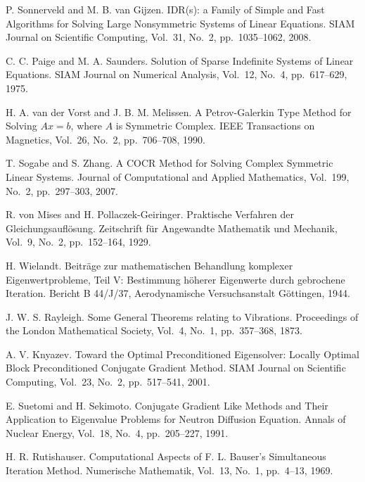 \documentclass[a4paper]{article}
\begin{document}
\begin{thebibliography}{10}
P. Sonnerveld and M. B. van Gijzen.
\newblock IDR(s): a Family of Simple and Fast Algorithms for Solving Large Nonsymmetric Systems of Linear Equations.
\newblock SIAM Journal on Scientific Computing, Vol.~31, No.~2, pp.\ 1035--1062, 2008.

C. C. Paige and M. A. Saunders.
\newblock Solution of Sparse Indefinite Systems of Linear Equations.
\newblock SIAM Journal on Numerical Analysis, Vol.~12, No.~4, pp.\ 617--629, 1975.

H. A. van der Vorst and J. B. M. Melissen.
\newblock A Petrov-Galerkin Type Method for Solving $Ax=b$, where $A$ is Symmetric Complex.
\newblock IEEE Transactions on Magnetics, Vol.~26, No.~2, pp.\ 706--708, 1990.

T. Sogabe and S. Zhang.
\newblock A COCR Method for Solving Complex Symmetric Linear Systems.
\newblock Journal of Computational and Applied Mathematics, Vol.~199, No.~2, pp.\ 297--303, 2007.

R. von Mises and H. Pollaczek-Geiringer.
\newblock Praktische Verfahren der Gleichungsaufl\"osung.
\newblock Zeitschrift f\"ur Angewandte Mathematik und Mechanik, Vol.~9,
	No.~2, pp.\ 152--164, 1929.

H. Wielandt.
\newblock Beitr\"age zur mathematischen Behandlung komplexer
	Eigenwertprobleme, Teil V: Bestimmung h\"oherer Eigenwerte durch
	gebrochene Iteration.
\newblock Bericht B 44/J/37, Aerodynamische Versuchsanstalt G\"ottingen, 1944.

J. W. S. Rayleigh.
\newblock Some General Theorems relating to Vibrations.
\newblock Proceedings of the London Mathematical Society, Vol.~4, No.~1,
	pp.\ 357--368, 1873.

A. V. Knyazev.
\newblock Toward the Optimal Preconditioned Eigensolver: Locally Optimal
	Block Preconditioned Conjugate Gradient Method.
\newblock SIAM Journal on Scientific Computing, Vol.~23, No.~2, pp.\ 517--541, 2001.

E. Suetomi and H. Sekimoto.
\newblock Conjugate Gradient Like Methods and Their Application to
	Eigenvalue Problems for Neutron Diffusion Equation.
\newblock Annals of Nuclear Energy, Vol.~18, No.~4, pp.\ 205--227, 1991.

H. R. Rutishauser.
\newblock Computational Aspects of F. L. Bauser's Simultaneous Iteration
	Method.
\newblock Numerische Mathematik, Vol.~13, No.~1, pp.\ 4--13, 1969.


\end{thebibliography}
\end{document}
